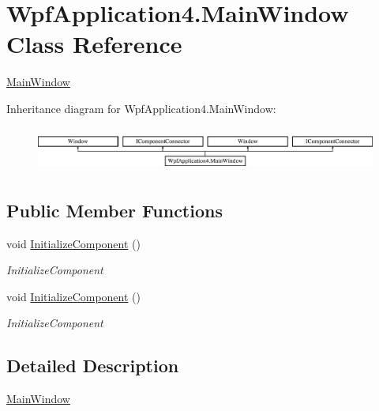 \hypertarget{class_wpf_application4_1_1_main_window}{\section{Wpf\-Application4.\-Main\-Window Class Reference}
\label{class_wpf_application4_1_1_main_window}
}


\hyperlink{class_wpf_application4_1_1_main_window}{Main\-Window}  


Inheritance diagram for Wpf\-Application4.\-Main\-Window\-:\begin{figure}[H]
\begin{center}
\leavevmode
\includegraphics[height=1.489362cm]{class_wpf_application4_1_1_main_window}
\end{center}
\end{figure}
\subsection*{Public Member Functions}
\begin{DoxyCompactItemize}
\item 
void \hyperlink{class_wpf_application4_1_1_main_window_ab083c073f35c2d1f18b230aeef1c8a53}{Initialize\-Component} ()
\begin{DoxyCompactList}\small\item\em Initialize\-Component \end{DoxyCompactList}\item 
void \hyperlink{class_wpf_application4_1_1_main_window_ab083c073f35c2d1f18b230aeef1c8a53}{Initialize\-Component} ()
\begin{DoxyCompactList}\small\item\em Initialize\-Component \end{DoxyCompactList}\end{DoxyCompactItemize}


\subsection{Detailed Description}
\hyperlink{class_wpf_application4_1_1_main_window}{Main\-Window} 



